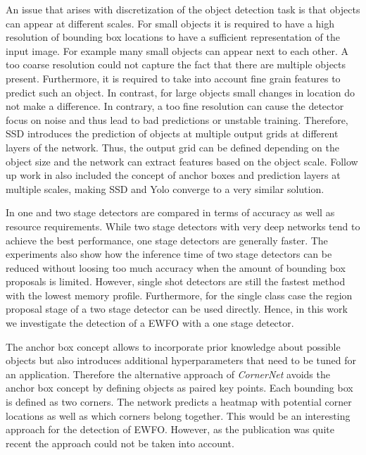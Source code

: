 An issue that arises with discretization of the object detection task is that objects can appear at different scales. For small objects it is required to have a high resolution of bounding box locations to have a sufficient representation of the input image. For example many small objects can appear next to each other. A too coarse resolution could not capture the fact that there are multiple objects present. Furthermore, it is required to take into account fine grain features to predict such an object. In contrast, for large objects small changes in location do not make a difference. In contrary, a too fine resolution can cause the detector focus on noise and thus lead to bad predictions or unstable training. Therefore, \ac{SSD} introduces the prediction of objects at multiple output grids at different layers of the network. Thus, the output grid can be defined depending on the object size and the network can extract features based on the object scale. Follow up work in \cite{Redmon, Redmona} also included the concept of anchor boxes and prediction layers at multiple scales, making \ac{SSD} and \ac{Yolo} converge to a very similar solution.


In \cite{Huang} one and two stage detectors are compared in terms of accuracy as well as resource requirements. While two stage detectors with very deep networks tend to achieve the best performance, one stage detectors are generally faster. The experiments also show how the inference time of two stage detectors can be reduced without loosing too much accuracy when the amount of bounding box proposals is limited. However, single shot detectors are still the fastest method with the lowest memory profile. Furthermore, for the single class case the region proposal stage of a two stage detector can be used directly. Hence, in this work we investigate the detection of a \ac{EWFO} with a one stage detector. 

The anchor box concept allows to incorporate prior knowledge about possible objects but also introduces additional hyperparameters that need to be tuned for an application. Therefore the alternative approach of \textit{CornerNet}\cite{Law2018} avoids the anchor box concept by defining objects as paired key points. Each bounding box is defined as two corners. The network predicts a heatmap with potential corner locations as well as which corners belong together. This would be an interesting approach for the detection of \ac{EWFO}. However, as the publication was quite recent the approach could not be taken into account. 

